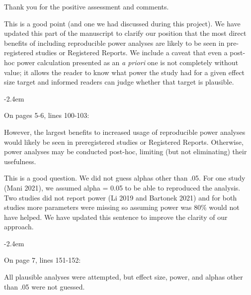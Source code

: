 \documentclass[final]{article}
\renewenvironment{quote}{\begin{fquote}\advance\leftmargini -2.4em\begin{oldquote}}{\end{oldquote}\end{fquote}}
\newenvironment{fquote}
  {\def\FrameCommand{
	\fboxsep=0.6em %
	\fcolorbox{black}{white}}%
    \MakeFramed {\advance\hsize-2\width \FrameRestore}
    \begin{minipage}{\linewidth}
  }
  {\end{minipage}\endMakeFramed}
\begin{document}
Thank you for the positive assessment and comments.


This is a good point (and one we had discussed during this project). We have updated this part of the manuscript to clarify our position that the most direct benefits of including reproducible power analyses are likely to be seen in pre-registered studies or Registered Reports. We include a caveat that even a post-hoc power calculation presented as an \emph{a priori} one is not completely without value; it allows the reader to know what power the study had for a given effect size target and informed readers can judge whether that target is plausible.

\begin{quote}
On pages 5-6, lines 100-103:

However, the largest benefits to increased usage of reproducible power analyses would likely be seen in preregistered studies or Registered Reports. Otherwise, power analyses may be conducted post-hoc, limiting (but not eliminating) their usefulness.
\end{quote}


This is a good question. We did not guess alphas other than .05. For one study (Mani 2021), we assumed alpha = 0.05 to be able to reproduced the analysis. Two studies did not report power (Li 2019 and Bartonek 2021) and for both studies more parameters were missing so assuming power was 80\% would not have helped. We have updated this sentence to improve the clarity of our approach.

\begin{quote}
On page 7, lines 151-152:

All plausible analyses were attempted, but effect size, power, and alphas other than .05 were not guessed.
\end{quote}
\end{document}
